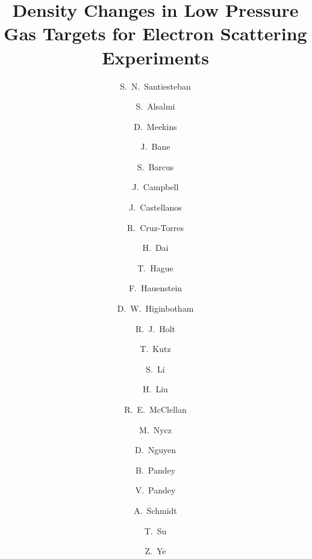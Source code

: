 \documentclass[final,5p,times,twocolumn]{elsarticle}
\begin{document}
\begin{frontmatter}


\title{Density Changes in Low Pressure Gas Targets for Electron Scattering Experiments}

\author[UNH]{S.~N.~Santiesteban}
\author[Kent]{S.~Alsalmi}
\author[JLab]{D.~Meekins}
\author[TN]{J.~Bane}
\author[WM]{S.~Barcus}
\author[SM]{J.~Campbell}
\author[FI]{J.~Castellanos}
\author[MIT]{R.~Cruz-Torres}
\author[VT]{H.~Dai}
\author[Kent]{T.~Hague}
\author[OD]{F.~Hauenstein}
\author[JLab]{D.~W.~Higinbotham}
\author[argonne,CalTech]{R.~J.~Holt}
\author[SB]{T.~Kutz}
\author[UNH]{S.~Li}
\author[COL]{H.~Liu}
\author[JLab]{R.~E.~McClellan}
\author[Kent]{M.~Nycz}
\author[UVa]{ D.~Nguyen}
\author[hampton]{B.~Pandey}
\author[VT]{V.~Pandey}
\author[MIT]{A.~Schmidt}
\author[Kent]{T.~Su}
\author[argonne]{Z.~Ye}


\address[UNH]{University of New Hampshire, Durham, New Hampshire 03824, USA}
\address[Kent]{Kent State University, Kent, Ohio 44240, USA}
\address[JLab]{Jefferson Lab, Newport News, Virginia 23601 USA}
\address[TN]{The University of Tennessee, Knoxville, Tennessee 37996, USA}
\address[WM]{The College of William and Mary, Williamsburg, Virginia 23187, USA}
\address[SM]{Saint Mary's University, Halifax, Nova Scotia, Canada}
\address[FI]{Florida International University, Miami, Florida 33199 USA}
\address[MIT]{Massachusetts Institute of Technology, Cambridge, Massachusetts 02139, USA}
\address[VT]{Center for Neutrino Physics, Virginia Tech, Blacksburg, Virginia 24061, USA}
\address[OD]{Old Dominion University, Norfolk, Virginia 23529, USA}
\address[CalTech]{Kellogg Radiation Laboratory, California Institute of Technology, Pasadena California 91125 USA}
\address[argonne]{Physics Division, Argonne National Laboratory, Argonne, Illinois 60439, USA}
\address[COL]{Columbia University, New York, New York 10027, USA}
\address[SB]{Stony Brook University, Stony Brook, New York 11794, USA}
\address[UVA]{Department of Physics, University of Virginia, Charlottesville, Virginia 22904, USA}
\address[hampton]{Hampton University, Hampton, Virginia 23669, USA}


\end{frontmatter}
\end{document}
